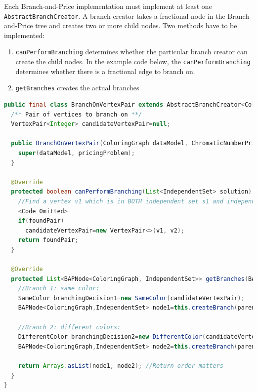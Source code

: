 \documentclass[a4paper]{article}
\newenvironment{myblock}[1]{%
    \tcolorbox[beamer,%
    noparskip,breakable,
    colback=lightBlueCodeBlock,colframe=darkBlueCodeBlock,%
    colbacklower=darkBlueCodeBlock!75!lightBlueCodeBlock,%
    coltitle=blueTitleCodeBlock,
    title=#1]}%
    {\endtcolorbox}
\newcommand{\code}[1]{\lstinline[language=java, style=seminar]!#1!}
\begin{document}
Each Branch-and-Price implementation must implement at least one \code{AbstractBranchCreator}. A branch creator takes a fractional node in the Branch-and-Price tree and creates two or more child nodes. Two methods have to be implemented:
\begin{enumerate}
 \item \code{canPerformBranching} determines whether the particular branch creator can create the child nodes. In the example code below, the \code{canPerformBranching} determines whether there is a fractional edge to branch on.
 \item \code{getBranches} creates the actual branches
\end{enumerate}
\begin{myblock}{BranchOnVertexPair}
\begin{lstlisting}[language=java, style=eclipseArticle, xleftmargin=2em]  
public final class BranchOnVertexPair extends AbstractBranchCreator<ColoringGraph, IndependentSet, ChromaticNumberPricingProblem> {
  /** Pair of vertices to branch on **/
  VertexPair<Integer> candidateVertexPair=null;

  public BranchOnVertexPair(ColoringGraph dataModel, ChromaticNumberPricingProblem pricingProblem) {
    super(dataModel, pricingProblem);
  }

  @Override
  protected boolean canPerformBranching(List<IndependentSet> solution) {
    //Find a vertex v1 which is in BOTH independent set s1 and independent set s2, and a vertex v2 which is ONLY in s1.
    <Code Omitted>
    if(foundPair)
      candidateVertexPair=new VertexPair<>(v1, v2);
    return foundPair;
  }

  @Override
  protected List<BAPNode<ColoringGraph, IndependentSet>> getBranches(BAPNode<ColoringGraph, IndependentSet> parentNode) {
    //Branch 1: same color:
    SameColor branchingDecision1=new SameColor(candidateVertexPair);
    BAPNode<ColoringGraph,IndependentSet> node1=this.createBranch(parentNode, branchingDecision1, parentNode.getSolution(), parentNode.getInequalities());

    //Branch 2: different colors:
    DifferentColor branchingDecision2=new DifferentColor(candidateVertexPair);
    BAPNode<ColoringGraph,IndependentSet> node2=this.createBranch(parentNode, branchingDecision2, parentNode.getSolution(), parentNode.getInequalities());

    return Arrays.asList(node1, node2); //Return order matters
  }
}
\end{lstlisting}
\end{myblock}
\end{document}
